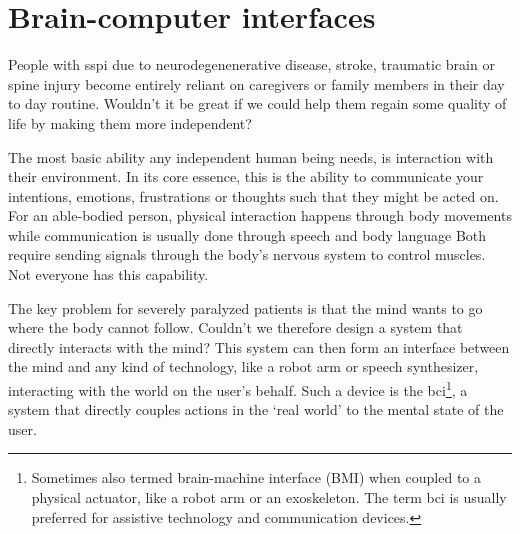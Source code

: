 \chapter{Brain-computer interfaces}
\label{sec:bci}
People with \ac{sspi} due to
neurodegenenerative disease, stroke, traumatic brain or spine injury
become entirely reliant on caregivers or family members in their day to day
routine.
Wouldn't it be great if we could help them regain some quality of life by
making them more independent?

The most basic ability any independent human being needs, is interaction with
their environment.
In its core essence, this is the ability to communicate your intentions,
emotions, frustrations or thoughts such that they might be acted on.
For an able-bodied person, physical interaction happens through body movements
while communication is usually done through speech and body language
Both require sending signals through the body's nervous system to control
muscles.
Not everyone has this capability.

The key problem for severely paralyzed patients is that the mind wants to go
where the body cannot follow.
Couldn't we therefore design a system that directly interacts with the mind?
This system can then form an interface between the mind and any kind of
technology, like a robot arm or speech synthesizer, interacting with the world
on the user's behalf.
Such a device is the \ac{bci}\footnote{Sometimes also
termed brain-machine interface (BMI) when coupled to a physical actuator, like
a robot arm or an exoskeleton.
The term \ac{bci} is usually preferred for
assistive technology and communication devices.
},
a system that directly couples actions in the `real world' to the mental state of
the user.

